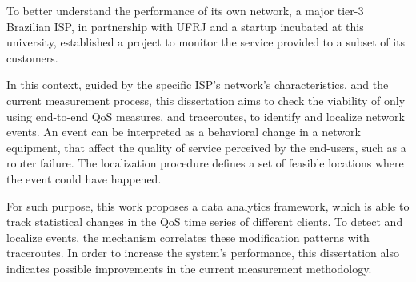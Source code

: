 To better understand the performance of its own network, a major
tier-3 Brazilian ISP, in partnership with UFRJ and a startup incubated at this
university,
established a project to monitor the service provided to a subset
of its customers.

In this context, guided by the specific ISP's network's characteristics,
and the current measurement process,
this dissertation aims to check the viability of
only using end-to-end QoS measures, and traceroutes,
to identify and localize network events. An event can be interpreted as a
behavioral change in a network equipment, that affect the quality of service
perceived by the end-users,
such as a router failure. The localization procedure defines a set of
feasible locations where the event could have happened.

For such purpose, this work proposes a data analytics framework, which is able
to track statistical changes in the QoS time series of different
clients.
To detect and localize events, the mechanism correlates these modification
patterns with traceroutes.
In order to increase the system's performance,
this dissertation also indicates possible improvements in the current
measurement methodology.
